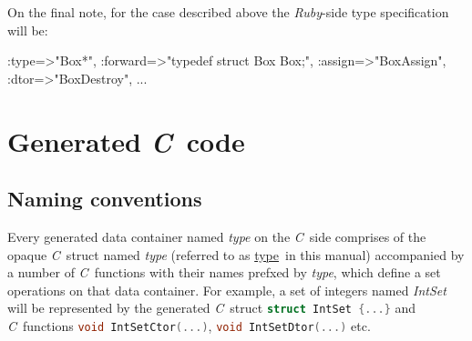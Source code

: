 \documentclass[a4paper]{article}
\newcommand{\R}{\emph{Ruby}}
\newcommand{\C}{\emph{C}}
\newcommand{\st}{\underline{type}}
\newcommand{\sv}{\emph{self}}
\newcommand{\meth}[1]{#1}
\begin{document}
On the final note, for the case described above the \R-side type specification will be:


\begin{rs}
{
	:type=>"Box*",
	:forward=>"typedef struct Box Box;",
	:assign=>"BoxAssign",
	:dtor=>"BoxDestroy",
	...
}
\end{rs}


\section{Generated \C\ code}


\newcommand{\commonmethods}{


\item \meth{void \st Dtor(\st*\ \sv)}


Destroys the container along with all contained elements.


\item \meth{\st* \st New(size\_t \emph{size})}


Returns a new heap-allocated container constructed with \meth{\st Ctor()}.


\item \meth{void \st Destroy(\st* \sv)}


Frees the heap-allocated container destroying all contained elements.
Calls the respective destructor \meth{\st Dtor()} behind the scenes.


\item \meth{\st* \st Assign(\st* \sv)}


\emph{Should be called on heap-allocated containers only.}


\item \meth{size\_t \st Size(\st* \sv)}


Returns the number of elements in container.

	
}


\subsection{Naming conventions}


Every generated data container named \emph{type} on the \C\ side comprises of the opaque \C\ struct named \emph{type} (referred to as \st\ in this manual) accompanied by a number of \C\ functions with their names prefxed by \emph{type}, which define a set operations on that data container.
For example, a set of integers named \emph{IntSet} will be represented by the generated \C\ struct \lstinline[language=C]!struct IntSet {...}! and \C\ functions \lstinline[language=C]!void IntSetCtor(...)!, \lstinline[language=C]!void IntSetDtor(...)! etc.
\end{document}
